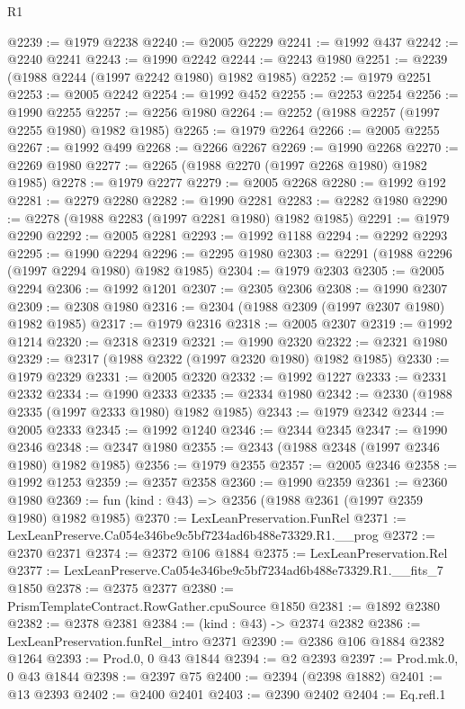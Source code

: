 \begin{lexlean}{R1}
\begin{coremodule}
@2239 := @1979 @2238
@2240 := @2005 @2229
@2241 := @1992 @437
@2242 := @2240 @2241
@2243 := @1990 @2242
@2244 := @2243 @1980
@2251 := @2239 (@1988 @2244 (@1997 @2242 @1980) @1982 @1985)
@2252 := @1979 @2251
@2253 := @2005 @2242
@2254 := @1992 @452
@2255 := @2253 @2254
@2256 := @1990 @2255
@2257 := @2256 @1980
@2264 := @2252 (@1988 @2257 (@1997 @2255 @1980) @1982 @1985)
@2265 := @1979 @2264
@2266 := @2005 @2255
@2267 := @1992 @499
@2268 := @2266 @2267
@2269 := @1990 @2268
@2270 := @2269 @1980
@2277 := @2265 (@1988 @2270 (@1997 @2268 @1980) @1982 @1985)
@2278 := @1979 @2277
@2279 := @2005 @2268
@2280 := @1992 @192
@2281 := @2279 @2280
@2282 := @1990 @2281
@2283 := @2282 @1980
@2290 := @2278 (@1988 @2283 (@1997 @2281 @1980) @1982 @1985)
@2291 := @1979 @2290
@2292 := @2005 @2281
@2293 := @1992 @1188
@2294 := @2292 @2293
@2295 := @1990 @2294
@2296 := @2295 @1980
@2303 := @2291 (@1988 @2296 (@1997 @2294 @1980) @1982 @1985)
@2304 := @1979 @2303
@2305 := @2005 @2294
@2306 := @1992 @1201
@2307 := @2305 @2306
@2308 := @1990 @2307
@2309 := @2308 @1980
@2316 := @2304 (@1988 @2309 (@1997 @2307 @1980) @1982 @1985)
@2317 := @1979 @2316
@2318 := @2005 @2307
@2319 := @1992 @1214
@2320 := @2318 @2319
@2321 := @1990 @2320
@2322 := @2321 @1980
@2329 := @2317 (@1988 @2322 (@1997 @2320 @1980) @1982 @1985)
@2330 := @1979 @2329
@2331 := @2005 @2320
@2332 := @1992 @1227
@2333 := @2331 @2332
@2334 := @1990 @2333
@2335 := @2334 @1980
@2342 := @2330 (@1988 @2335 (@1997 @2333 @1980) @1982 @1985)
@2343 := @1979 @2342
@2344 := @2005 @2333
@2345 := @1992 @1240
@2346 := @2344 @2345
@2347 := @1990 @2346
@2348 := @2347 @1980
@2355 := @2343 (@1988 @2348 (@1997 @2346 @1980) @1982 @1985)
@2356 := @1979 @2355
@2357 := @2005 @2346
@2358 := @1992 @1253
@2359 := @2357 @2358
@2360 := @1990 @2359
@2361 := @2360 @1980
@2369 := fun (kind : @43) => @2356 (@1988 @2361 (@1997 @2359 @1980) @1982 @1985)
@2370 := LexLeanPreservation.FunRel
@2371 := LexLeanPreserve.Ca054e346be9c5bf7234ad6b488e73329.R1.__prog
@2372 := @2370 @2371
@2374 := @2372 @106 @1884
@2375 := LexLeanPreservation.Rel
@2377 := LexLeanPreserve.Ca054e346be9c5bf7234ad6b488e73329.R1.__fits_7 @1850
@2378 := @2375 @2377
@2380 := PrismTemplateContract.RowGather.cpuSource @1850
@2381 := @1892 @2380
@2382 := @2378 @2381
@2384 := (kind : @43) -> @2374 @2382
@2386 := LexLeanPreservation.funRel_intro @2371
@2390 := @2386 @106 @1884 @2382 @1264
@2393 := Prod.{0, 0} @43 @1844
@2394 := @2 @2393
@2397 := Prod.mk.{0, 0} @43 @1844
@2398 := @2397 @75
@2400 := @2394 (@2398 @1882)
@2401 := @13 @2393
@2402 := @2400 @2401
@2403 := @2390 @2402
@2404 := Eq.refl.{1}

\end{coremodule}
\end{lexlean}
